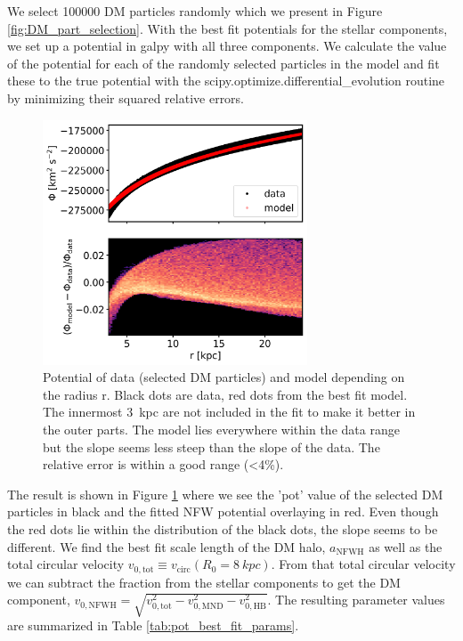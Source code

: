 We select 100000 \ac{DM} particles randomly which we present in Figure \ref{fig:DM_part_selection}. With the best fit potentials for the stellar components, we set up a potential in galpy with all three components. We calculate the value of the potential for each of the randomly selected particles in the model and fit these to the true potential with the scipy.optimize.differential\_evolution routine by minimizing their squared relative errors.
\begin{figure}
\captionsetup{format=plain}
    \centering
    \includegraphics[width=0.7\textwidth]{plots/Auriga/phi_model_and_data_snap_with_rel_error_127.png}
    \caption{Potential of data (selected \ac{DM} particles) and model depending on the radius r. Black dots are data, red dots from the best fit model. The innermost \SI{3}{kpc} are not included in the fit to make it better in the outer parts. The model lies everywhere within the data range but the slope seems less steep than the slope of the data. The relative error is within a good range (<4\%).}
    \label{fig:potential_best_fit}
\end{figure}
The result is shown in Figure \ref{fig:potential_best_fit} where we see the 'pot' value of the selected \ac{DM} particles in black and the fitted \ac{NFW} potential overlaying in red. Even though the red dots lie within the distribution of the black dots, the slope seems to be different. We find the best fit scale length of the \ac{DM} halo, $a_{\mathrm{NFWH}}$ as well as the total circular velocity $v_{0,\mathrm{tot}} \equiv v_{\mathrm{circ}}(R_0 = \SI{8}{kpc}) $. From that total circular velocity we can subtract the fraction from the stellar components to get the \ac{DM} component, $v_{0,\mathrm{NFWH}} = \sqrt{v_{0,\mathrm{tot}}^2 - v_{0, \mathrm{MND}}^2 - v_{0, \mathrm{HB}}^2}$. The resulting parameter values are summarized in Table \ref{tab:pot_best_fit_params}. 

